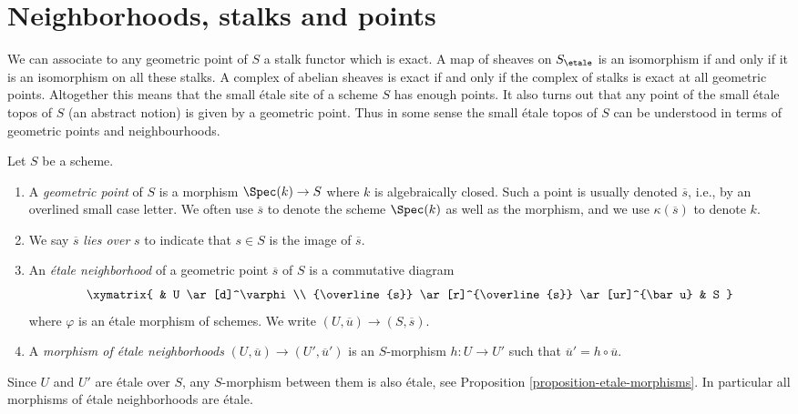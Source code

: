 \section{Neighborhoods, stalks and points}
\label{section-stalks}

\noindent
We can associate to any geometric point of $S$ a stalk functor which is
exact. A map of sheaves on $S_\etale$ is an isomorphism if and only
if it
is an isomorphism on all these stalks. A complex of abelian sheaves is
exact if and only if the complex of stalks is exact at all geometric points.
Altogether this means that the small \'etale site of a scheme $S$
has enough points. It also turns out that any point of the small \'etale topos
of $S$ (an abstract notion) is given by a geometric point.
Thus in some sense the small \'etale topos of $S$ can be understood in
terms of geometric points and neighbourhoods.

\begin{definition}
\label{definition-geometric-point}
Let $S$ be a scheme.
\begin{enumerate}
\item A {\it geometric point} of $S$ is a morphism
$\Spec(k) \to S$ where $k$ is algebraically closed.
Such a point is usually denoted $\overline{s}$, i.e., by an overlined
small case letter. We often use $\overline{s}$ to denote the scheme
$\Spec(k)$ as well as the morphism, and we use $\kappa(\overline{s})$
to denote $k$.
\item We say $\overline{s}$ {\it lies over} $s$
to indicate that $s \in S$ is the image of $\overline{s}$.
\item An {\it \'etale neighborhood} of a geometric point $\overline{s}$
of $S$ is a commutative diagram
$$
\xymatrix{
& U \ar[d]^\varphi \\
{\overline{s}} \ar[r]^{\overline{s}} \ar[ur]^{\bar u} & S
}
$$
where $\varphi$ is an \'etale morphism of schemes.
We write $(U, \overline{u}) \to (S, \overline{s})$.
\item A {\it morphism of \'etale neighborhoods}
$(U, \overline{u}) \to (U', \overline{u}')$
is an $S$-morphism $h: U \to U'$
such that $\overline{u}' = h \circ \overline{u}$.
\end{enumerate}
\end{definition}

\begin{remark}
\label{remark-etale-between-etale}
Since $U$ and $U'$ are \'etale over $S$, any $S$-morphism
between them is also \'etale, see
Proposition \ref{proposition-etale-morphisms}.
In particular all morphisms of \'etale neighborhoods are \'etale.
\end{remark}

